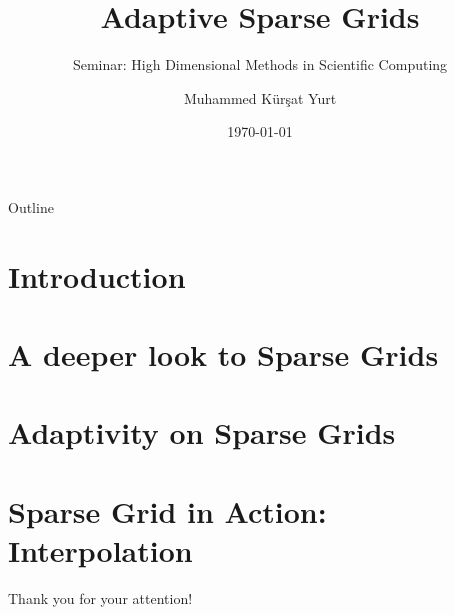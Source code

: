 \documentclass[xcolor=table,aspectratio=169]{beamer}
\title[SCCS Seminar | High Dimensional Methods | Adaptive Sparse Grids]{Adaptive Sparse Grids}
\subtitle{Seminar: High Dimensional Methods in Scientific Computing}
\author{Muhammed K\"{u}r\c{s}at Yurt}
\date{\today}
\begin{document}
\frame{\titlepage}

\begin{frame}{Outline}
  \tableofcontents
\end{frame}

\section[]{Introduction}


\section[]{A deeper look to Sparse Grids}



\section[]{Adaptivity on Sparse Grids}



\section[]{Sparse Grid in Action: Interpolation}



\begin{frame}
  \centering
  \LARGE{Thank you for your attention!}
\end{frame}
\end{document}

